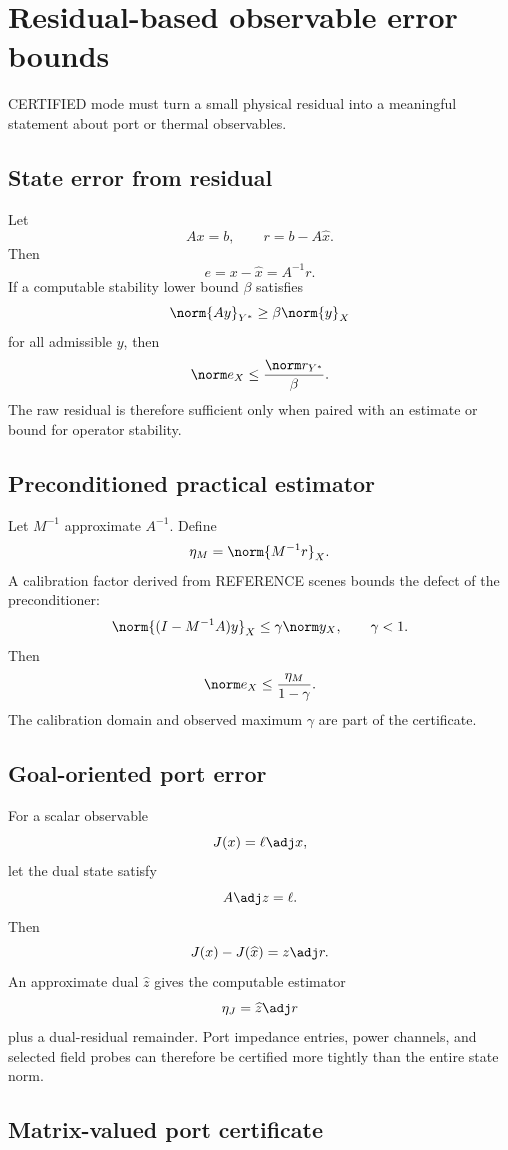 \section{Residual-based observable error bounds}
\label{sec:residual-bounds}

CERTIFIED mode must turn a small physical residual into a meaningful statement
about port or thermal observables.

\subsection{State error from residual}

Let
\[
 Ax=b,\qquad r=b-A\widehat x.
\]
Then
\[
 e=x-\widehat x=A^{-1}r.
\]
If a computable stability lower bound $\beta$ satisfies
\[
 \norm{Ay}_{Y^\ast}\ge\beta\norm{y}_X
\]
for all admissible $y$, then
\[
 \norm e_X
 \le
 \frac{\norm r_{Y^\ast}}{\beta}.
\]
The raw residual is therefore sufficient only when paired with an estimate or
bound for operator stability.

\subsection{Preconditioned practical estimator}

Let $M^{-1}$ approximate $A^{-1}$. Define
\[
 \eta_M=\norm{M^{-1}r}_X.
\]
A calibration factor derived from REFERENCE scenes bounds the defect of the
preconditioner:
\[
 \norm{(I-M^{-1}A)y}_X\le\gamma\norm y_X,\qquad \gamma<1.
\]
Then
\[
 \norm e_X
 \le
 \frac{\eta_M}{1-\gamma}.
\]
The calibration domain and observed maximum $\gamma$ are part of the
certificate.

\subsection{Goal-oriented port error}

For a scalar observable
\[
 J(x)=\ell\adj x,
\]
let the dual state satisfy
\[
 A\adj z=\ell.
\]
Then
\[
 J(x)-J(\widehat x)=z\adj r.
\]
An approximate dual $\widehat z$ gives the computable estimator
\[
 \eta_J=\widehat z\adj r
\]
plus a dual-residual remainder. Port impedance entries, power channels, and
selected field probes can therefore be certified more tightly than the entire
state norm.

\subsection{Matrix-valued port certificate}


